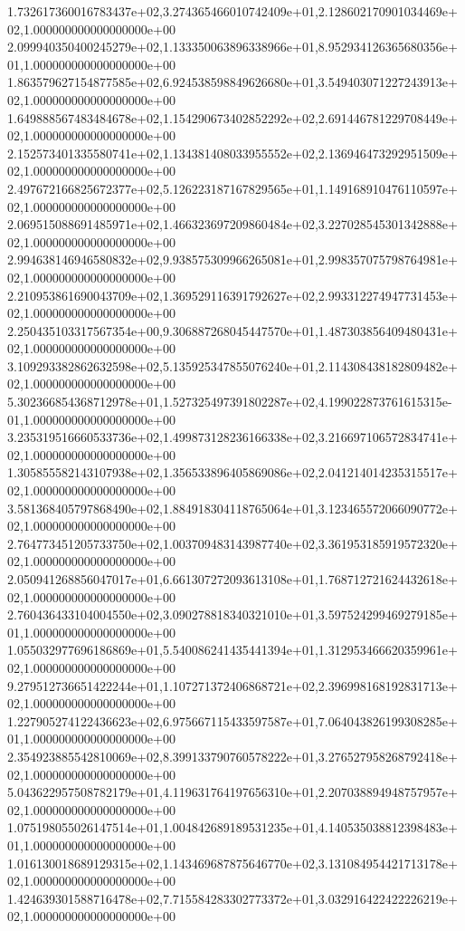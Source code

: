 1.732617360016783437e+02,3.274365466010742409e+01,2.128602170901034469e+02,1.000000000000000000e+00
2.099940350400245279e+02,1.133350063896338966e+01,8.952934126365680356e+01,1.000000000000000000e+00
1.863579627154877585e+02,6.924538598849626680e+01,3.549403071227243913e+02,1.000000000000000000e+00
1.649888567483484678e+02,1.154290673402852292e+02,2.691446781229708449e+02,1.000000000000000000e+00
2.152573401335580741e+02,1.134381408033955552e+02,2.136946473292951509e+02,1.000000000000000000e+00
2.497672166825672377e+02,5.126223187167829565e+01,1.149168910476110597e+02,1.000000000000000000e+00
2.069515088691485971e+02,1.466323697209860484e+02,3.227028545301342888e+02,1.000000000000000000e+00
2.994638146946580832e+02,9.938575309966265081e+01,2.998357075798764981e+02,1.000000000000000000e+00
2.210953861690043709e+02,1.369529116391792627e+02,2.993312274947731453e+02,1.000000000000000000e+00
2.250435103317567354e+00,9.306887268045447570e+01,1.487303856409480431e+02,1.000000000000000000e+00
3.109293382862632598e+02,5.135925347855076240e+01,2.114308438182809482e+02,1.000000000000000000e+00
5.302366854368712978e+01,1.527325497391802287e+02,4.199022873761615315e-01,1.000000000000000000e+00
3.235319516660533736e+02,1.499873128236166338e+02,3.216697106572834741e+02,1.000000000000000000e+00
1.305855582143107938e+02,1.356533896405869086e+02,2.041214014235315517e+02,1.000000000000000000e+00
3.581368405797868490e+02,1.884918304118765064e+01,3.123465572066090772e+02,1.000000000000000000e+00
2.764773451205733750e+02,1.003709483143987740e+02,3.361953185919572320e+02,1.000000000000000000e+00
2.050941268856047017e+01,6.661307272093613108e+01,1.768712721624432618e+02,1.000000000000000000e+00
2.760436433104004550e+02,3.090278818340321010e+01,3.597524299469279185e+01,1.000000000000000000e+00
1.055032977696186869e+01,5.540086241435441394e+01,1.312953466620359961e+02,1.000000000000000000e+00
9.279512736651422244e+01,1.107271372406868721e+02,2.396998168192831713e+02,1.000000000000000000e+00
1.227905274122436623e+02,6.975667115433597587e+01,7.064043826199308285e+01,1.000000000000000000e+00
2.354923885542810069e+02,8.399133790760578222e+01,3.276527958268792418e+02,1.000000000000000000e+00
5.043622957508782179e+01,4.119631764197656310e+01,2.207038894948757957e+02,1.000000000000000000e+00
1.075198055026147514e+01,1.004842689189531235e+01,4.140535038812398483e+01,1.000000000000000000e+00
1.016130018689129315e+02,1.143469687875646770e+02,3.131084954421713178e+02,1.000000000000000000e+00
1.424639301588716478e+02,7.715584283302773372e+01,3.032916422422226219e+02,1.000000000000000000e+00

